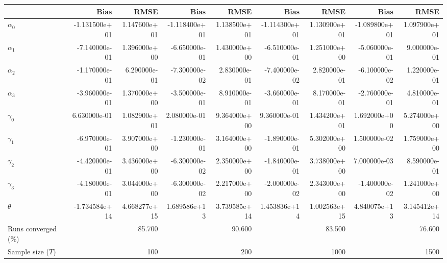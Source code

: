 
\begin{tabular}[t]{lrrrrrrrr}
\toprule
  & Bias & RMSE & Bias & RMSE & Bias & RMSE & Bias & RMSE\\
\midrule
$\alpha_{0}$ & -1.131500e+01 & 1.147600e+01 & -1.118400e+01 & 1.138500e+01 & -1.114300e+01 & 1.130900e+01 & -1.089800e+01 & 1.097900e+01\\
$\alpha_{1}$ & -7.140000e-01 & 1.396000e+00 & -6.650000e-01 & 1.430000e+00 & -6.510000e-01 & 1.251000e+00 & -5.060000e-01 & 9.000000e-01\\
$\alpha_{2}$ & -1.170000e-01 & 6.290000e-01 & -7.300000e-02 & 2.830000e-01 & -7.400000e-02 & 2.820000e-01 & -6.100000e-02 & 1.220000e-01\\
$\alpha_{3}$ & -3.960000e-01 & 1.370000e+00 & -3.500000e-01 & 8.910000e-01 & -3.660000e-01 & 8.170000e-01 & -2.760000e-01 & 4.810000e-01\\
$\gamma_{0}$ & 6.630000e-01 & 1.082900e+01 & 2.080000e-01 & 9.364000e+00 & 9.360000e-01 & 1.434200e+01 & 1.692000e+00 & 5.274000e+00\\
$\gamma_{1}$ & -6.970000e-01 & 3.907000e+00 & -1.230000e-01 & 3.164000e+00 & -1.890000e-01 & 5.302000e+00 & 1.500000e-02 & 1.759000e+00\\
$\gamma_{2}$ & -4.420000e-01 & 3.436000e+00 & -6.300000e-02 & 2.350000e+00 & -1.840000e-01 & 3.738000e+00 & 7.000000e-03 & 8.590000e-01\\
$\gamma_{3}$ & -4.180000e-01 & 3.044000e+00 & -6.300000e-02 & 2.217000e+00 & -2.000000e-02 & 2.343000e+00 & -1.400000e-02 & 1.241000e+00\\
$\theta$ & -1.734584e+14 & 4.668277e+15 & 1.689586e+13 & 3.739585e+14 & 1.453836e+14 & 1.002563e+15 & 4.840075e+13 & 3.145412e+14\\
Runs converged (\%) &  & 85.700 &  & 90.600 &  & 83.500 &  & 76.600\\
Sample size ($T$) &  & 100 &  & 200 &  & 1000 &  & 1500\\
\bottomrule
\end{tabular}
